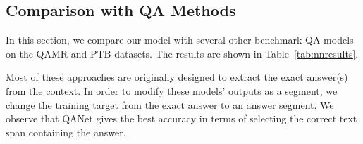 \subsection{Comparison with QA Methods}
In this section, we compare our model with several other benchmark QA models on the QAMR and PTB datasets. The results are shown in Table~\ref{tab:nnresults}. 
\begin{table}[h]
	\centering
\caption{\fontsize{10}{12}\selectfont  Our model vs. popular QA models.}\label{tab:nnresults}
  \vspace{-2ex}
\end{table}
Most of these approaches are originally designed to extract the exact answer(s) from the context. In order to modify these models' outputs as a segment, we change the training target from the exact answer to an answer segment. We observe that QANet gives the best accuracy in terms of selecting the correct text span containing the answer. 




